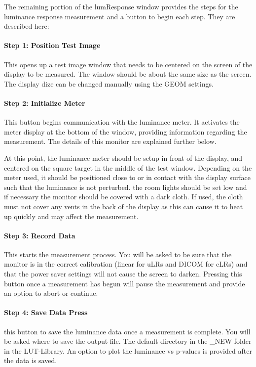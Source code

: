 The remaining portion of the lumResponse window provides the steps for the luminance response measurement and a button to begin each step. They are described here: 

\paragraph{Step 1: Position Test Image} This opens up a test image window that needs to be centered on the screen of the display to be measured. The window should be about the same size as the screen. The display dize can be changed manually using the GEOM settings. 

\paragraph{Step 2: Initialize Meter} This button begins communication with the luminance meter. It activates the meter display at the bottom of the window, providing information regarding the measurement. The details of this monitor are explained further below.

At this point, the luminance meter should be setup in front of the display, and centered on the square target in the middle of the test window. Depending on the meter used, it should be positioned close to or in contact with the display surface such that the luminance is not perturbed. the room lights should be set low and if necessary the monitor should be covered with a dark cloth. If used, the cloth must not cover any vents in the back of the display as this can cause it to heat up quickly and may affect the measurement. 

\paragraph{Step 3: Record Data} This starts the measurement process. You will be asked to be sure that the monitor is in the correct calibration (linear for uLRs and DICOM for cLRs) and that the power saver settings will not cause the screen to darken. Pressing this button once a measurement has begun will pause the measurement and provide an option to abort or continue. 

\paragraph{Step 4: Save Data Press} this button to save the luminance data once a measurement is complete. You will be asked where to save the output file. The default directory in the \_NEW folder in the LUT-Library. An option to plot the luminance vs p-values is provided after the data is saved.

